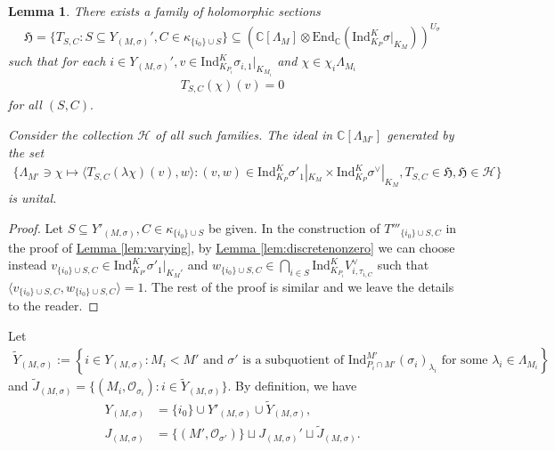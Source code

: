 \documentclass[10pt]{amsart}
\newtheorem{lemma}[theorem]{Lemma}
\theoremstyle{definition}
\numberwithin{equation}{section}
\numberwithin{equation}{subsection}
\newcommand{\Ind}{\mathrm{Ind}}
\newcommand{\CC}{\mathbb{C}}
\begin{document}
\begin{lemma}\label{lem:varying:discrete}
There exists a family of holomorphic sections 
    \begin{align*}
        \mathfrak{H}=\{T_{S,C}:S\subseteq Y_{(M,\sigma)}', C\in \kappa_{\{i_0\}\cup S}\}\subseteq (\CC[\Lambda_M]\otimes \mathrm{End}_\CC (\Ind_{K_P}^K \sigma|_{K_M}))^{U_\sigma}
    \end{align*}
    such that for each $i\in Y_{(M,\sigma)}',v\in \mathrm{Ind}_{K_{P_i}}^K \sigma_{i,1}|_{K_{M_i}}$ and $\chi\in \chi_i\Lambda_{M_i}$
    \begin{align*}
        T_{S,C}(\chi)(v)=0
    \end{align*}
    for all $(S,C).$ 
    
    Consider the collection $\mathcal{H}$ of all such families. The ideal in $\CC[\Lambda_{M'}]$ generated by the set 
    \begin{align*}
        \big\{\Lambda_{M'}\ni \chi\mapsto \langle T_{S,C}(\lambda\chi)(v),w \rangle: (v,w)\in \mathrm{Ind}_{K_{P}}^K \sigma'_{1}|_{K_M}\times \mathrm{Ind}_{K_{P}}^K \sigma^\lor|_{K_M}, T_{S,C}\in \mathfrak{H}, \mathfrak{H}\in \mathcal{H}\big\}
    \end{align*}
    is unital. 
\end{lemma}
\begin{proof}
    Let $S\subseteq Y'_{(M,\sigma)}, C\in \kappa_{\{i_0\}\cup S}$ be given. In the construction of $T'''_{\{i_0\}\cup S,C}$ in the proof of \hyperref[lem:varying]{Lemma \ref{lem:varying}},  by  \hyperref[lem:discretenonzero]{Lemma \ref{lem:discretenonzero}} we can choose instead $v_{\{i_0\}\cup S,C}\in \Ind_{K_{P'}}^{K} \sigma'_1|_{K_M'}$ and $w_{\{i_0\}\cup S,C}\in \bigcap_{i\in S} \Ind_{K_{P_i}}^{K}V_{i,\tau_{i,C}}^\lor$ such that $\langle v_{\{i_0\}\cup S ,C},w_{\{i_0\}\cup S,C}\rangle=1.$ The rest of the proof is similar and we leave the details to the reader.
\end{proof}


Let
\begin{align*}
    \widetilde{Y}_{(M,\sigma)} := \left\{i\in Y_{(M,\sigma)}: M_i<M'\text{ and $\sigma'$ is a subquotient of $\Ind_{P_i\cap M'}^{M'} (\sigma_i)_{\lambda_i}$ for some $\lambda_i\in \Lambda_{M_i}$}\right\}
\end{align*}
and $\widetilde{J}_{(M,\sigma)} = \{(M_i,\mathcal{O}_{\sigma_i}):i\in\widetilde{Y}_{(M,\sigma)} \}$. By definition, we have
\begin{align*}
    Y_{(M,\sigma)} &= \{i_0\}\cup Y'_{(M,\sigma)}\cup \widetilde{Y}_{(M,\sigma)},\\
    J_{(M,\sigma)} &= \{ (M',\mathcal{O}_{\sigma'})\}\sqcup J_{(M,\sigma)}'\sqcup  \widetilde{J}_{(M,\sigma)}.
\end{align*}
\end{document}
